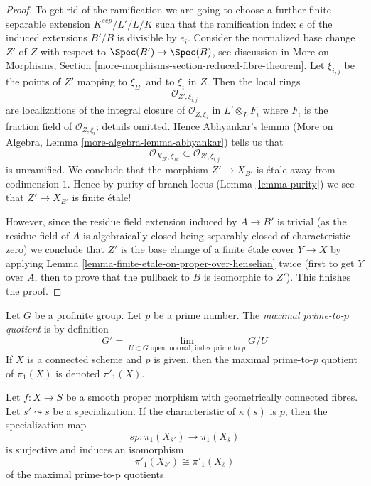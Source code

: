 \begin{proof}
\medskip\noindent
To get rid of the ramification we are going to choose a further finite
separable extension $K^{sep}/L'/L/K$ such that the ramification
index $e$ of the induced extensions $B'/B$ is divisible by $e_i$.
Consider the normalized base change $Z'$ of $Z$ with respect to
$\Spec(B') \to \Spec(B)$, see discussion in
More on Morphisms, Section \ref{more-morphisms-section-reduced-fibre-theorem}.
Let $\xi_{i, j}$ be the points of $Z'$ mapping to $\xi_{B'}$
and to $\xi_i$ in $Z$. Then the local rings
$$
\mathcal{O}_{Z', \xi_{i, j}}
$$
are localizations of the integral closure of $\mathcal{O}_{Z, \xi_i}$
in $L' \otimes_L F_i$ where $F_i$ is the fraction field of
$\mathcal{O}_{Z, \xi_i}$; details omitted. Hence Abhyankar's lemma
(More on Algebra, Lemma \ref{more-algebra-lemma-abhyankar})
tells us that
$$
\mathcal{O}_{X_{B'}, \xi_{B'}} \subset \mathcal{O}_{Z', \xi_{i, j}}
$$
is unramified. We conclude that the morphism $Z' \to X_{B'}$
is \'etale away from codimension $1$. Hence by purity of
branch locus (Lemma \ref{lemma-purity})
we see that $Z' \to X_{B'}$ is finite \'etale!

\medskip\noindent
However, since the residue field extension induced by $A \to B'$
is trivial (as the residue field of $A$ is algebraically closed
being separably closed of characteristic zero)
we conclude that $Z'$ is the base change of a finite \'etale
cover $Y \to X$ by applying
Lemma \ref{lemma-finite-etale-on-proper-over-henselian}
twice (first to get $Y$ over $A$, then to prove that
the pullback to $B$ is isomorphic to $Z'$).
This finishes the proof.
\end{proof}

\noindent
Let $G$ be a profinite group. Let $p$ be a prime number.
The {\it maximal prime-to-$p$ quotient} is by definition
$$
G' = \lim_{U \subset G\text{ open, normal, index prime to }p} G/U
$$
If $X$ is a connected scheme and $p$ is given, then the maximal
prime-to-$p$ quotient of $\pi_1(X)$ is denoted $\pi'_1(X)$.

\begin{theorem}
\label{theorem-specialization-map-isomorphism-prime-to-p}
Let $f : X \to S$ be a smooth proper morphism with geometrically
connected fibres. Let $s' \leadsto s$ be a specialization.
If the characteristic of $\kappa(s)$ is $p$, then the specialization
map
$$
sp : \pi_1(X_{\overline{s}'}) \to \pi_1(X_{\overline{s}})
$$
is surjective and induces an isomorphism
$$
\pi'_1(X_{\overline{s}'}) \cong \pi'_1(X_{\overline{s}})
$$
of the maximal prime-to-p quotients
\end{theorem}

